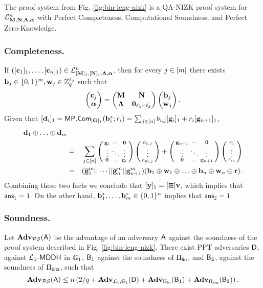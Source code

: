 \begin{theorem}
The proof system from Fig. \ref{fig:bin-leng-nizk} is a QA-NIZK proof system for $\mathcal{L}_{\mathbf{{M}},\mathbf{{N}},\mathbf{{\Lambda}},{\boldsymbol \alpha}}^n$ with Perfect Completeness, Computational Soundness, and Perfect Zero-Knowledge.
\end{theorem}


\subsubsection{Completeness.} If $([\mathbf{c}_1]_1,\ldots,
[\mathbf{{c}}_n]_1) \in\mathcal{L}_{[\mathbf{{M}}]_1,[\mathbf{{N}}]_1,\mathbf{{\Lambda}},{\boldsymbol \alpha}}^n$, then for every $j\in[{m}]$ there exists $\mathbf{{b}}_j\in\{0,1\}^{{m}},\mathbf{{w}}_j \in\mathbb{Z}_q^{{\ell_2}}$ such that 
$$
\left(\begin{matrix}
\mathbf{{c}}_j\\
{\boldsymbol \alpha}
\end{matrix}\right)
=
\begin{pmatrix}
\mathbf{{M}}       & \mathbf{{N}}\\
\mathbf{{\Lambda}} & \mathbf{{0}}_{{\ell_3}\times {\ell_2}}
\end{pmatrix}
\left(\begin{matrix}
    \mathbf{{b}}_j\\
    \mathbf{{w}}_j
\end{matrix}\right).
$$
Given that $[\mathbf{{d}}_i]_1 = \mathsf{MP}.\mathsf{Com}_{[\mathbf{{G}}]_1}(\mathbf{b}_i^*;r_i)=\sum_{j\in[n]}b_{i,j}[\mathbf{g}_i]_1+r_i[\mathbf{g}_{n+1}]_1$,
\begin{eqnarray*}
 \mathbf{d}_1\oplus\ldots\oplus\mathbf{d}_{m}\\
          &=&  {\sum_{j\in[n]}\left(\begin{smallmatrix}\mathbf{g}_i & \cdots & \mathbf{0}\\\vdots & \ddots & \vdots\\\mathbf{0}& \ldots & \mathbf{g}_i\end{smallmatrix}\right)\left(\begin{smallmatrix}b_{1,j}\\\vdots\\b_{{m},j}\end{smallmatrix}\right)+\left(\begin{smallmatrix}\mathbf{g}_{n+1} & \cdots & \mathbf{0}\\\vdots & \ddots & \vdots\\\mathbf{0}& \ldots & \mathbf{g}_{n+1}\end{smallmatrix}\right)\left(\begin{smallmatrix}r_1\\\vdots\\r_{m}\end{smallmatrix}\right)}\\
         &= & (\overline{\mathbf{g}}_1^{m}||\cdots||\overline{\mathbf{g}}_{n}^{m}||\mathbf{g}_{n+1}^{m})(\mathbf{b}_1\oplus\mathbf{w}_1\oplus\ldots\oplus\mathbf{b}_n\oplus\mathbf{w}_n\oplus\mathbf{r}).
\end{eqnarray*}
Combining these two facts we conclude that
$[\mathbf{y}]_1 = [\mathbf{{\Xi}}] \mathbf{v}$, which implies that $\mathsf{ans}_1=1$. On the other hand, $\mathbf{b}_1^*,\ldots,\mathbf{b}_{m}^*\in\{0,1\}^n$ implies that $\mathsf{ans}_2=1$.
  
\subsubsection{Soundness.}

\begin{theorem}
Let $\mathbf{Adv}_{\mathcal{PS}}(\mathsf{A})$ be the advantage of an adversary $\mathsf{A}$ against the soundness of the proof system described in Fig. \ref{fig:bin-leng-nizk}. There exist PPT adversaries $\mathsf{D}$, against $\mathcal{L}_1\mbox{-}\mathsf{MDDH}$ in $\mathbb{G}_1$, $\mathsf{B}_1$ against the soundness of $\Pi_{\mathsf{lin}}$, and $\mathsf{B}_2$, against the soundness of $\Pi_{\mathsf{bits}}$, such that
$$
\mathbf{Adv}_{\mathcal{PS}}(\mathsf{A})\leq n\left(2/q + \mathbf{Adv}_{\mathcal{L}_1,\mathbb{G}_1}(\mathsf{D})+\mathbf{Adv}_{\Pi_{\mathsf{lin}}}(\mathsf{B}_1)+\mathbf{Adv}_{\Pi_{\mathsf{bits}}}(\mathsf{B}_2)\right).
$$
\end{theorem}

